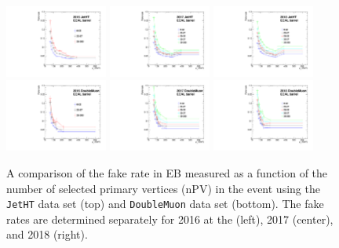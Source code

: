 \begin{figure}[!htbp]
\caption{A comparison of the fake rate in EB measured as a function of the number of selected primary vertices (nPV) in the event using the \texttt{JetHT} data set (top) and \texttt{DoubleMuon} data set (bottom). The fake rates are determined separately for 2016 at the (left), 2017 (center), and 2018 (right).}
\centering
\includegraphics[width=0.3\textwidth]{fig/compare_pv_EB_2016_jetht.pdf}
\includegraphics[width=0.3\textwidth]{fig/compare_pv_EB_2017_jetht.pdf}
\includegraphics[width=0.3\textwidth]{fig/compare_pv_EB_2018_jetht.pdf}\\
\includegraphics[width=0.3\textwidth]{fig/compare_pv_EB_2016_doublemuon.pdf}
\includegraphics[width=0.3\textwidth]{fig/compare_pv_EB_2017_doublemuon.pdf}
\includegraphics[width=0.3\textwidth]{fig/compare_pv_EB_2018_doublemuon.pdf}
\label{fig:frpileup_EB}
\end{figure}

